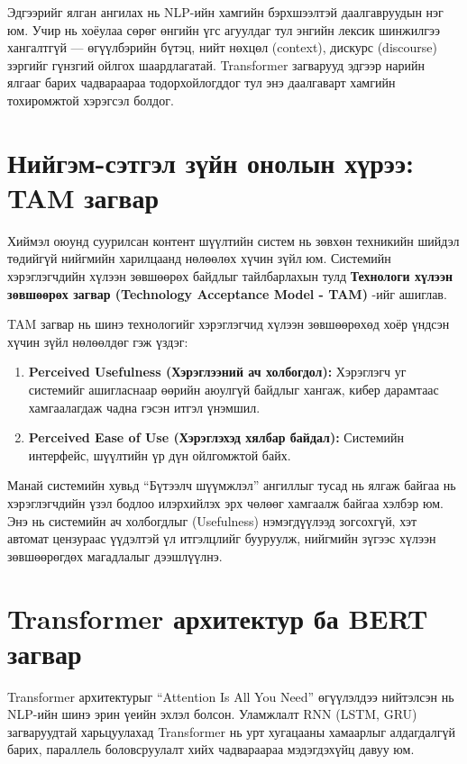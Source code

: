 Эдгээрийг ялган ангилах нь NLP-ийн хамгийн бэрхшээлтэй даалгавруудын нэг юм.
Учир нь хоёулаа сөрөг өнгийн үгс агуулдаг тул энгийн лексик шинжилгээ
хангалтгүй --- өгүүлбэрийн бүтэц, нийт нөхцөл (context), дискурс (discourse)
зэргийг гүнзгий ойлгох шаардлагатай. Transformer загварууд эдгээр нарийн
ялгааг барих чадвараараа тодорхойлогддог тул энэ даалгаварт хамгийн тохиромжтой
хэрэгсэл болдог.

\section{Нийгэм-сэтгэл зүйн онолын хүрээ: TAM загвар}

Хиймэл оюунд суурилсан контент шүүлтийн систем нь зөвхөн техникийн шийдэл
төдийгүй нийгмийн харилцаанд нөлөөлөх хүчин зүйл юм. Системийн хэрэглэгчдийн
хүлээн зөвшөөрөх байдлыг тайлбарлахын тулд \textbf{Технологи хүлээн зөвшөөрөх
загвар (Technology Acceptance Model - TAM)} \cite{davis1989}-ийг ашиглав.

TAM загвар нь шинэ технологийг хэрэглэгчид хүлээн зөвшөөрөхөд хоёр үндсэн
хүчин зүйл нөлөөлдөг гэж үздэг:
\begin{enumerate}
    \item \textbf{Perceived Usefulness (Хэрэглээний ач холбогдол):} Хэрэглэгч уг
    системийг ашигласнаар өөрийн аюулгүй байдлыг хангаж, кибер дарамтаас
    хамгаалагдаж чадна гэсэн итгэл үнэмшил.
    \item \textbf{Perceived Ease of Use (Хэрэглэхэд хялбар байдал):} Системийн
    интерфейс, шүүлтийн үр дүн ойлгомжтой байх.
\end{enumerate}

Манай системийн хувьд ``Бүтээлч шүүмжлэл'' ангиллыг тусад нь ялгаж байгаа
нь хэрэглэгчдийн үзэл бодлоо илэрхийлэх эрх чөлөөг хамгаалж байгаа хэлбэр юм.
Энэ нь системийн ач холбогдлыг (Usefulness) нэмэгдүүлээд зогсохгүй, хэт
автомат цензураас үүдэлтэй үл итгэлцлийг бууруулж, нийгмийн зүгээс хүлээн
зөвшөөрөгдөх магадлалыг дээшлүүлнэ.

\section{Transformer архитектур ба BERT загвар}
\label{sec:transformer}

Transformer архитектурыг \cite{vaswani2017} ``Attention Is All You Need''
өгүүлэлдээ нийтэлсэн нь NLP-ийн шинэ эрин үеийн эхлэл болсон. Уламжлалт
RNN (LSTM, GRU) загваруудтай харьцуулахад Transformer нь урт хугацааны
хамаарлыг алдагдалгүй барих, параллель боловсруулалт хийх чадвараараа
мэдэгдэхүйц давуу юм.

